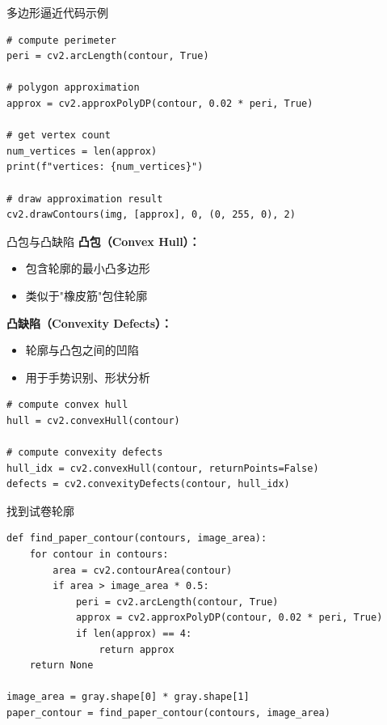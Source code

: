 \begin{frame}[fragile]{多边形逼近代码示例}
    \begin{lstlisting}[basicstyle=\ttfamily\scriptsize]
# compute perimeter
peri = cv2.arcLength(contour, True)

# polygon approximation
approx = cv2.approxPolyDP(contour, 0.02 * peri, True)

# get vertex count
num_vertices = len(approx)
print(f"vertices: {num_vertices}")

# draw approximation result
cv2.drawContours(img, [approx], 0, (0, 255, 0), 2)
    \end{lstlisting}

\end{frame}

\begin{frame}[fragile]{凸包与凸缺陷}
    \textbf{凸包（Convex Hull）：}
    \begin{itemize}
        \item 包含轮廓的最小凸多边形
        \item 类似于"橡皮筋"包住轮廓
    \end{itemize}

    \vspace{0.2cm}

    \textbf{凸缺陷（Convexity Defects）：}
    \begin{itemize}
        \item 轮廓与凸包之间的凹陷
        \item 用于手势识别、形状分析
    \end{itemize}

    \begin{lstlisting}[basicstyle=\ttfamily\scriptsize]
# compute convex hull
hull = cv2.convexHull(contour)

# compute convexity defects
hull_idx = cv2.convexHull(contour, returnPoints=False)
defects = cv2.convexityDefects(contour, hull_idx)
    \end{lstlisting}

\end{frame}

\begin{frame}[fragile]{找到试卷轮廓}
    \begin{lstlisting}[basicstyle=\ttfamily\small]
def find_paper_contour(contours, image_area):
    for contour in contours:
        area = cv2.contourArea(contour)
        if area > image_area * 0.5:
            peri = cv2.arcLength(contour, True)
            approx = cv2.approxPolyDP(contour, 0.02 * peri, True)
            if len(approx) == 4:
                return approx
    return None

image_area = gray.shape[0] * gray.shape[1]
paper_contour = find_paper_contour(contours, image_area)
    \end{lstlisting}

\end{frame}

